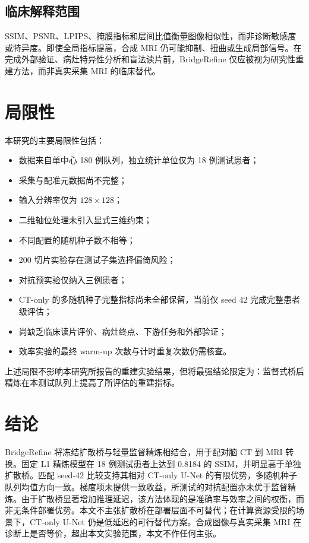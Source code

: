 \documentclass[UTF8,12pt,a4paper,twocolumn]{ctexart}
\begin{document}
\subsection{临床解释范围}
SSIM、PSNR、LPIPS、掩膜指标和层间比值衡量图像相似性，而非诊断敏感度或特异度。即使全局指标提高，合成 MRI 仍可能抑制、扭曲或生成局部信号。在完成外部验证、病灶特异性分析和盲法读片前，BridgeRefine 仅应被视为研究性重建方法，而非真实采集 MRI 的临床替代。

\section{局限性}
本研究的主要局限性包括：
\begin{itemize}
\item 数据来自单中心 180 例队列，独立统计单位仅为 18 例测试患者；
\item 采集与配准元数据尚不完整；
\item 输入分辨率仅为 $128\times128$；
\item 二维轴位处理未引入显式三维约束；
\item 不同配置的随机种子数不相等；
\item 200 切片实验存在测试子集选择偏倚风险；
\item 对抗预实验仅纳入三例患者；
\item CT-only 的多随机种子完整指标尚未全部保留，当前仅 seed 42 完成完整患者级评估；
\item 尚缺乏临床读片评价、病灶终点、下游任务和外部验证；
\item 效率实验的最终 warm-up 次数与计时重复次数仍需核查。
\end{itemize}
上述局限不影响本研究所报告的重建实验结果，但将最强结论限定为：监督式桥后精炼在本测试队列上提高了所评估的重建指标。

\section{结论}
BridgeRefine 将冻结扩散桥与轻量监督精炼相结合，用于配对脑 CT 到 MRI 转换。固定 L1 精炼模型在 18 例测试患者上达到 0.8184 的 SSIM，并明显高于单独扩散桥。匹配 seed-42 比较支持其相对 CT-only U-Net 的有限优势，多随机种子队列均值方向一致。梯度项未提供一致收益，所测试的对抗配置亦未优于监督精炼。由于扩散桥显著增加推理延迟，该方法体现的是准确率与效率之间的权衡，而非无条件部署优势。本文不主张扩散桥在部署层面不可替代；在计算资源受限的场景下，CT-only U-Net 仍是低延迟的可行替代方案。合成图像与真实采集 MRI 在诊断上是否等价，超出本文实验范围，本文不作任何主张。
\end{document}
